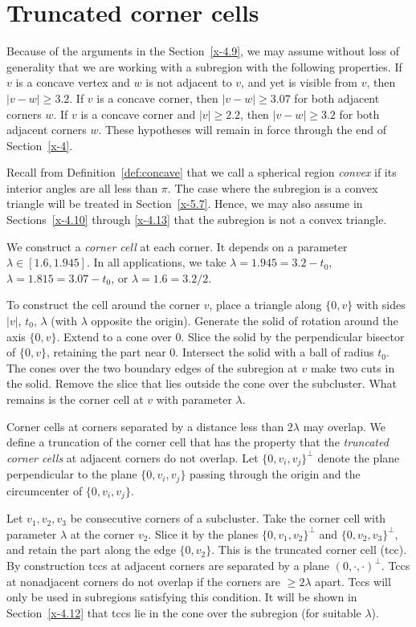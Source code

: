 \section{Truncated corner cells}

Because of the arguments in the Section~\ref{x-4.9}, we may assume
without loss of generality that we are working with a subregion with the
following properties. If $v$ is a concave vertex and $w$ is not adjacent
to $v$, and yet is visible from $v$, then $|v-w|\ge3.2$. If $v$ is a
concave corner, then $|v-w|\ge3.07$ for both adjacent corners $w$. If
$v$ is a concave corner and $|v|\ge2.2$, then $|v-w|\ge3.2$ for both
adjacent corners $w$. These hypotheses will remain in force through the
end of Section~\ref{x-4}.

Recall from Definition~\ref{def:concave} that we call a spherical
region {\it convex} if its interior angles are all less than
$\pi$. The case where the subregion is a convex triangle will be
treated in Section~\ref{x-5.7}. Hence, we may also assume in
Sections~\ref{x-4.10} through \ref{x-4.13} that the subregion is
not a convex triangle.

We construct a {\it corner cell\/} at each corner.  It depends on a
parameter $\lambda \in [1.6,1.945]$. In all applications, we take
    $\lambda = 1.945 = 3.2-t_0$, $\lambda = 1.815 = 3.07-t_0$, or
    $\lambda = 1.6 = 3.2/2$.

To construct the cell around the corner $v$, place a triangle along
$\{0,v\}$ with sides $|v|$, $t_0$, $\lambda$ (with $\lambda$
opposite the origin). Generate the solid of rotation around the axis
$\{0,v\}$.  Extend to a cone over $0$.  Slice the solid by the
perpendicular bisector of $\{0,v\}$, retaining the part near $0$.
Intersect the solid with a ball of radius $t_0$.   The cones over
the two boundary edges  of the subregion at
$v$ make two cuts in the solid.  Remove the slice that lies outside
the cone over the subcluster.  What remains is the corner cell at
$v$ with parameter $\lambda$.

Corner cells at corners separated by a distance less than $2\lambda$ may
overlap.  We define a truncation of the corner cell that has the
property that the {\it truncated corner cells\/} at adjacent corners do
not overlap. Let $\{0,v_i,v_j\}^\perp$ denote the plane perpendicular to
the plane $\{0,v_i,v_j\}$ passing through the origin and the circumcenter
of $\{0,v_i,v_j\}$.

Let $v_1,v_2,v_3$ be consecutive corners of a subcluster. Take the
corner cell with parameter $\lambda$ at the corner $v_2$.  Slice it by
the planes $\{0,v_1,v_2\}^\perp$ and $\{0,v_2,v_3\}^\perp$, and retain the
part along the edge $\{0,v_2\}$. This is the truncated corner cell (tcc).
By construction tccs at adjacent corners are separated by a plane
$(0,\cdot,\cdot)^\perp$. Tccs at nonadjacent corners do not overlap if
the corners are $\ge2\lambda$ apart. Tccs will only be used in
subregions satisfying this condition. It will be shown in
Section~\ref{x-4.12} that tccs lie in the cone over the subregion (for
suitable $\lambda$).


